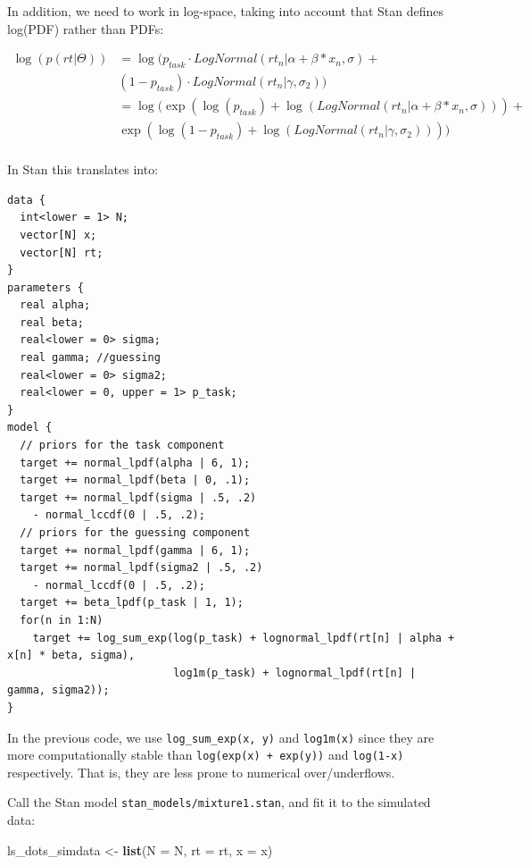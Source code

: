 \documentclass[12pt,]{krantz}
\newenvironment{Shaded}{\begin{snugshade}}{\end{snugshade}}
\newcommand{\KeywordTok}[1]{\textcolor[rgb]{0.13,0.29,0.53}{\textbf{#1}}}
\newcommand{\DataTypeTok}[1]{\textcolor[rgb]{0.13,0.29,0.53}{#1}}
\newcommand{\StringTok}[1]{\textcolor[rgb]{0.31,0.60,0.02}{#1}}
\newcommand{\NormalTok}[1]{#1}
\theoremstyle{definition}
\theoremstyle{definition}
\theoremstyle{definition}
\theoremstyle{remark}
\begin{document}
In addition, we need to work in log-space, taking into account that Stan
defines log(PDF) rather than PDFs:

\begin{equation}
\begin{aligned}
\log(p(rt | \Theta)) &= \log(p_{task} \cdot LogNormal(rt_n | \alpha + \beta * x_n, \sigma) +\\ 
    & (1 - p_{task}) \cdot LogNormal(rt_n | \gamma, \sigma_2)) \\
&= \log( \exp( \log(p_{task}) +  \log(LogNormal(rt_n | \alpha + \beta * x_n, \sigma))) +\\ 
    & \exp( \log(1 - p_{task}) + \log(LogNormal(rt_n | \gamma, \sigma_2)))) \\
\end{aligned}
\end{equation}

In Stan this translates into:

\begin{verbatim}
data {
  int<lower = 1> N;
  vector[N] x;
  vector[N] rt;
}
parameters {
  real alpha;
  real beta;
  real<lower = 0> sigma;
  real gamma; //guessing
  real<lower = 0> sigma2;
  real<lower = 0, upper = 1> p_task;
}
model {
  // priors for the task component
  target += normal_lpdf(alpha | 6, 1);
  target += normal_lpdf(beta | 0, .1);
  target += normal_lpdf(sigma | .5, .2)
    - normal_lccdf(0 | .5, .2);
  // priors for the guessing component
  target += normal_lpdf(gamma | 6, 1);
  target += normal_lpdf(sigma2 | .5, .2)
    - normal_lccdf(0 | .5, .2);
  target += beta_lpdf(p_task | 1, 1);
  for(n in 1:N)
    target += log_sum_exp(log(p_task) + lognormal_lpdf(rt[n] | alpha + x[n] * beta, sigma),
                          log1m(p_task) + lognormal_lpdf(rt[n] | gamma, sigma2));
}
\end{verbatim}

In the previous code, we use \texttt{log\_sum\_exp(x,\ y)} and
\texttt{log1m(x)} since they are more computationally stable than
\texttt{log(exp(x)\ +\ exp(y))} and \texttt{log(1-x)} respectively. That
is, they are less prone to numerical over/underflows.

Call the Stan model \texttt{stan\_models/mixture1.stan}, and fit it to
the simulated data:

\begin{Shaded}
\begin{Highlighting}[]
\NormalTok{ls_dots_simdata <-}\StringTok{ }\KeywordTok{list}\NormalTok{(}\DataTypeTok{N =}\NormalTok{ N,}
                        \DataTypeTok{rt =}\NormalTok{ rt,}
                        \DataTypeTok{x =}\NormalTok{ x) }
\end{Highlighting}
\end{Shaded}
\end{document}
